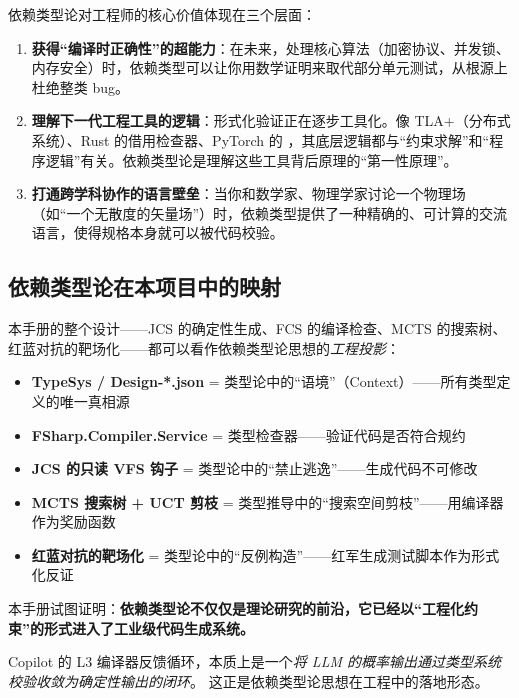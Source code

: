 \documentclass[10pt, openany]{book}
\begin{document}
依赖类型论对工程师的核心价值体现在三个层面：

\begin{enumerate}
    \item \textbf{获得“编译时正确性”的超能力}：在未来，处理核心算法（加密协议、并发锁、内存安全）时，依赖类型可以让你用数学证明来取代部分单元测试，从根源上杜绝整类 bug。
    
    \item \textbf{理解下一代工程工具的逻辑}：形式化验证正在逐步工具化。像 TLA+（分布式系统）、Rust 的借用检查器、PyTorch 的 ，其底层逻辑都与“约束求解”和“程序逻辑”有关。依赖类型论是理解这些工具背后原理的“第一性原理”。
    
    \item \textbf{打通跨学科协作的语言壁垒}：当你和数学家、物理学家讨论一个物理场（如“一个无散度的矢量场”）时，依赖类型提供了一种精确的、可计算的交流语言，使得规格本身就可以被代码校验。
\end{enumerate}

\subsection{依赖类型论在本项目中的映射}

本手册的整个设计——JCS 的确定性生成、FCS 的编译检查、MCTS 的搜索树、红蓝对抗的靶场化——都可以看作依赖类型论思想的\emph{工程投影}：

\begin{itemize}
    \item \textbf{TypeSys / Design-*.json} = 类型论中的“语境”（Context）——所有类型定义的唯一真相源
    \item \textbf{FSharp.Compiler.Service} = 类型检查器——验证代码是否符合规约
    \item \textbf{JCS 的只读 VFS 钩子} = 类型论中的“禁止逃逸”——生成代码不可修改
    \item \textbf{MCTS 搜索树 + UCT 剪枝} = 类型推导中的“搜索空间剪枝”——用编译器作为奖励函数
    \item \textbf{红蓝对抗的靶场化} = 类型论中的“反例构造”——红军生成测试脚本作为形式化反证
\end{itemize}

\begin{principle}[从类型论到工程]
本手册试图证明：\textbf{依赖类型论不仅仅是理论研究的前沿，它已经以“工程化约束”的形式进入了工业级代码生成系统。}

Copilot 的 L3 编译器反馈循环，本质上是一个\emph{将 LLM 的概率输出通过类型系统校验收敛为确定性输出的闭环}。
这正是依赖类型论思想在工程中的落地形态。
\end{principle}
\end{document}
